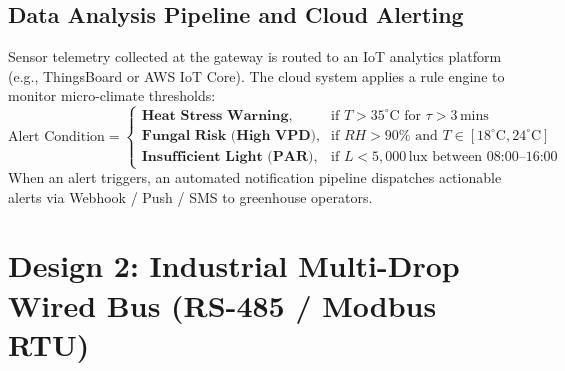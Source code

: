 \documentclass[12pt]{article}
\begin{document}
\subsection{Data Analysis Pipeline and Cloud Alerting}
Sensor telemetry collected at the gateway is routed to an IoT analytics platform (e.g., ThingsBoard or AWS IoT Core). The cloud system applies a rule engine to monitor micro-climate thresholds:
\begin{equation}
\text{Alert Condition} = \begin{cases}
    \textbf{Heat Stress Warning}, & \text{if } T > 35^\circ\text{C} \text{ for } \tau > 3\,\text{mins} \\
    \textbf{Fungal Risk (High VPD)}, & \text{if } RH > 90\% \text{ and } T \in [18^\circ\text{C}, 24^\circ\text{C}] \\
    \textbf{Insufficient Light (PAR)}, & \text{if } L < 5{,}000\,\text{lux between 08:00--16:00}
\end{cases}
\end{equation}
When an alert triggers, an automated notification pipeline dispatches actionable alerts via Webhook / Push / SMS to greenhouse operators.

\section{Design 2: Industrial Multi-Drop Wired Bus (RS-485 / Modbus RTU)}
\end{document}
